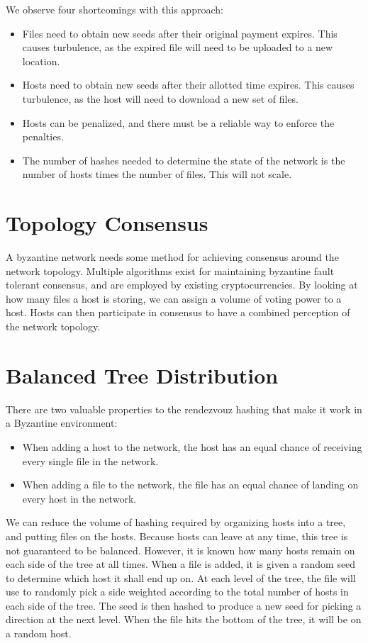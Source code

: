 \documentclass[twocolumn]{article}
\begin{document}
We observe four shortcomings with this approach:
\begin{itemize}
	\item Files need to obtain new seeds after their original payment expires. This causes turbulence, as the expired file will need to be uploaded to a new location.
	\item Hosts need to obtain new seeds after their allotted time expires. This causes turbulence, as the host will need to download a new set of files.
	\item Hosts can be penalized, and there must be a reliable way to enforce the penalties.
	\item The number of hashes needed to determine the state of the network is the number of hosts times the number of files. This will not scale.
\end{itemize}

\section{Topology Consensus}
A byzantine network needs some method for achieving consensus around the network topology.
Multiple algorithms exist for maintaining byzantine fault tolerant consensus, and are employed by existing cryptocurrencies.
By looking at how many files a host is storing, we can assign a volume of voting power to a host.
Hosts can then participate in consensus to have a combined perception of the network topology.

\section{Balanced Tree Distribution}
There are two valuable properties to the rendezvouz hashing that make it work in a Byzantine environment:
\begin{itemize}
	\item When adding a host to the network, the host has an equal chance of receiving every single file in the network.
	\item When adding a file to the network, the file has an equal chance of landing on every host in the network.
\end{itemize}
We can reduce the volume of hashing required by organizing hosts into a tree, and putting files on the hosts.
Because hosts can leave at any time, this tree is not guaranteed to be balanced.
However, it is known how many hosts remain on each side of the tree at all times.
When a file is added, it is given a random seed to determine which host it shall end up on.
At each level of the tree, the file will use to randomly pick a side weighted according to the total number of hosts in each side of the tree.
The seed is then hashed to produce a new seed for picking a direction at the next level.
When the file hits the bottom of the tree, it will be on a random host.
\end{document}
